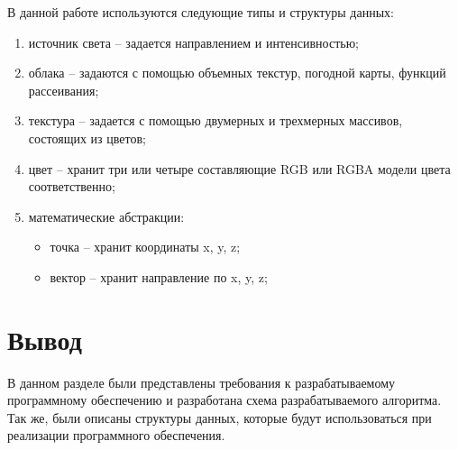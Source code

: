 В данной работе используются следующие типы и структуры данных:
\begin{enumerate}
	\item источник света -- задается направлением и интенсивностью;
	\item облака -- задаются с помощью объемных текстур, погодной карты, функций рассеивания;
	\item текстура -- задается с помощью двумерных и трехмерных массивов, состоящих из цветов;
	\item цвет -- хранит три или четыре составляющие RGB или RGBA модели цвета соответственно;
	\item математические абстракции: 
		\begin{itemize}
			\item точка -- хранит координаты x, y, z;
			\item вектор -- хранит направление по x, y, z;
		\end{itemize}
\end{enumerate}


\section*{Вывод}
В данном разделе были представлены требования к разрабатываемому
программному обеспечению и разработана схема разрабатываемого алгоритма.
Так же, были описаны структуры данных, которые будут использоваться при реализации программного обеспечения.

